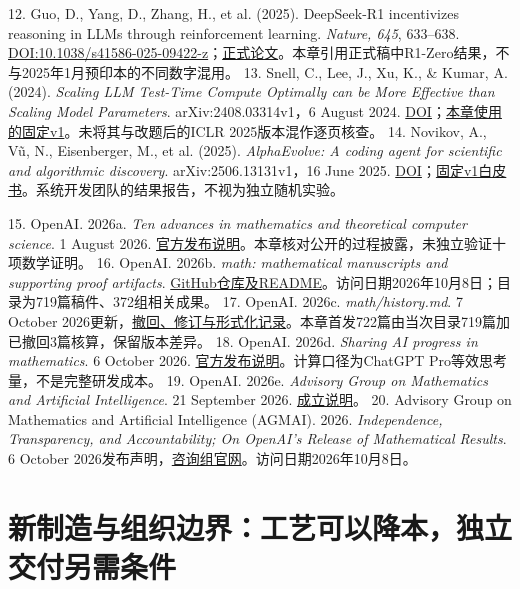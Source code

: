 \documentclass[UTF8,fontset=windows,12pt,a4paper,oneside,openany]{ctexbook}
\begin{document}
12. Guo, D., Yang, D., Zhang, H., et al. (2025). DeepSeek-R1 incentivizes reasoning in LLMs through reinforcement learning. \emph{Nature, 645}, 633–638. \href{https://doi.org/10.1038/s41586-025-09422-z}{DOI:10.1038/s41586-025-09422-z}；\href{https://www.nature.com/articles/s41586-025-09422-z}{正式论文}。本章引用正式稿中R1-Zero结果，不与2025年1月预印本的不同数字混用。
13. Snell, C., Lee, J., Xu, K., \& Kumar, A. (2024). \emph{Scaling LLM Test-Time Compute Optimally can be More Effective than Scaling Model Parameters}. arXiv:2408.03314v1，6 August 2024. \href{https://doi.org/10.48550/arXiv.2408.03314}{DOI}；\href{https://arxiv.org/html/2408.03314v1}{本章使用的固定v1}。未将其与改题后的ICLR 2025版本混作逐页核查。
14. Novikov, A., Vũ, N., Eisenberger, M., et al. (2025). \emph{AlphaEvolve: A coding agent for scientific and algorithmic discovery}. arXiv:2506.13131v1，16 June 2025. \href{https://doi.org/10.48550/arXiv.2506.13131}{DOI}；\href{https://arxiv.org/html/2506.13131v1}{固定v1白皮书}。系统开发团队的结果报告，不视为独立随机实验。

15. OpenAI. 2026a. \emph{Ten advances in mathematics and theoretical computer science}. 1 August 2026. \href{https://openai.com/index/ten-advances-in-mathematics/}{官方发布说明}。本章核对公开的过程披露，未独立验证十项数学证明。
16. OpenAI. 2026b. \emph{math: mathematical manuscripts and supporting proof artifacts}. \href{https://github.com/openai/math}{GitHub仓库及README}。访问日期2026年10月8日；目录为719篇稿件、372组相关成果。
17. OpenAI. 2026c. \emph{math/history.md}. 7 October 2026更新，\href{https://github.com/openai/math/blob/main/history.md}{撤回、修订与形式化记录}。本章首发722篇由当次目录719篇加已撤回3篇核算，保留版本差异。
18. OpenAI. 2026d. \emph{Sharing AI progress in mathematics}. 6 October 2026. \href{https://openai.com/index/sharing-ai-progress-in-mathematics/}{官方发布说明}。计算口径为ChatGPT Pro等效思考量，不是完整研发成本。
19. OpenAI. 2026e. \emph{Advisory Group on Mathematics and Artificial Intelligence}. 21 September 2026. \href{https://openai.com/index/advisory-group-on-mathematics-and-ai/}{成立说明}。
20. Advisory Group on Mathematics and Artificial Intelligence (AGMAI). 2026. \emph{Independence, Transparency, and Accountability; On OpenAI's Release of Mathematical Results}. 6 October 2026发布声明，\href{https://agmai.org/}{咨询组官网}。访问日期2026年10月8日。

\chapter{新制造与组织边界：工艺可以降本，独立交付另需条件}\label{ch:8}
\end{document}
